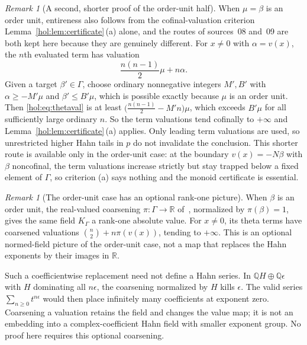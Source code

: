 \documentclass[11pt]{article}
\numberwithin{equation}{section}
\theoremstyle{definition}
\theoremstyle{remark}
\newtheorem{remark}[theorem]{Remark}
\newcommand{\R}{\mathbb R}
\newcommand{\Q}{\mathbb Q}
\newcommand{\K}{K_\Gamma}
\begin{document}
\begin{remark}[A second, shorter proof of the order-unit half]
\label{hol:rem:thetasecond}
When $\mu=\beta$ is an order unit, entireness also follows from the
cofinal-valuation criterion Lemma~\ref{hol:lem:certificate}\,(a) alone, and
the routes of sources~08 and~09 are both kept here because they are genuinely
different. For $x\ne0$ with $\alpha=v(x)$, the $n$th evaluated term has
valuation
\begin{equation}\label{hol:eq:thetaval}
 \frac{n(n-1)}2\mu+n\alpha.
\end{equation}
Given a target $\beta'\in\Gamma$, choose ordinary nonnegative integers $M',B'$
with $\alpha\ge-M'\mu$ and $\beta'\le B'\mu$, which is possible exactly
because $\mu$ is an order unit. Then \eqref{hol:eq:thetaval} is at least
$\bigl(\tfrac{n(n-1)}2-M'n\bigr)\mu$, which exceeds $B'\mu$ for all
sufficiently large ordinary $n$. So the term valuations tend cofinally to
$+\infty$ and Lemma~\ref{hol:lem:certificate}\,(a) applies. Only leading term
valuations are used, so unrestricted higher Hahn tails in $p$ do not
invalidate the conclusion. This shorter route is available only in the
order-unit case: at the boundary $v(x)=-N\beta$ with $\beta$ noncofinal, the
term valuations increase strictly but stay trapped below a fixed element of
$\Gamma$, so criterion (a) says nothing and the monoid certificate is
essential.
\end{remark}

\begin{remark}[The order-unit case has an optional rank-one picture]
\label{hol:rem:thetacoarse}
When $\beta$ is an order unit, the real-valued coarsening
$\pi:\Gamma\to\R$ of~\cite[Lemma~9.1]{repoentire}, normalized by
$\pi(\beta)=1$, gives the same field $\K$ a rank-one absolute value.
For $x\ne0$, its theta terms have coarsened valuations
$\binom n2+n\pi(v(x))$, tending to $+\infty$.
This is an optional normed-field picture of the order-unit case,
not a map that replaces the Hahn exponents by their images in $\R$.

Such a coefficientwise replacement need not define a Hahn series.
In $\Q H\oplus\Q\epsilon$ with $H$ dominating all $n\epsilon$,
the coarsening normalized by $H$ kills $\epsilon$.
The valid series $\sum_{n\ge0}t^{n\epsilon}$ would then place infinitely
many coefficients at exponent zero. Coarsening a valuation retains
the field and changes the value map; it is not an embedding into a
complex-coefficient Hahn field with smaller exponent group.
No proof here requires this optional coarsening.
\end{remark}
\end{document}
